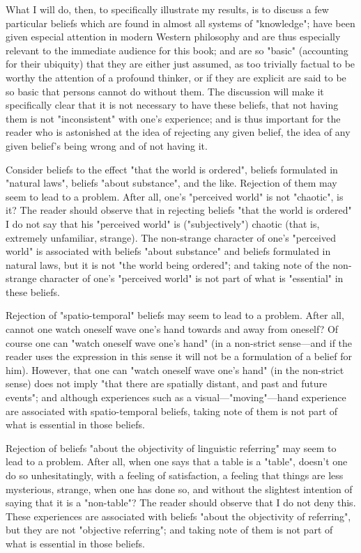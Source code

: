 \documentclass[10pt,twoside]{memoir}
\begin{document}
\begin{enumerate}
{What I will do, then, to specifically illustrate my results, is to discuss a 
few particular beliefs which are found in almost all systems of "knowledge"; 
have been given especial attention in modern Western philosophy and are 
thus especially relevant to the immediate audience for this book; and are so 
"basic" (accounting for their ubiquity) that they are either just assumed, as 
too trivially factual to be worthy the attention of a profound thinker, or if 
they are explicit are said to be so basic that persons cannot do without them. 
The discussion will make it specifically clear that it is not necessary to have 
these beliefs, that not having them is not "inconsistent" with one's 
experience; and is thus important for the reader who is astonished at the idea 
of rejecting any given belief, the idea of any given belief's being wrong and 
of not having it. 

Consider beliefs to the effect "that the world is ordered", beliefs 
formulated in "natural laws", beliefs "about substance", and the like. 
Rejection of them may seem to lead to a problem. After all, one's "perceived 
world" is not "chaotic", is it? The reader should observe that in rejecting 
beliefs "that the world is ordered" I do not say that his "perceived world" is 
("subjectively") chaotic (that is, extremely unfamiliar, strange). The 
non-strange character of one's "perceived world" is associated with beliefs 
"about substance" and beliefs formulated in natural laws, but it is not "the 
world being ordered"; and taking note of the non-strange character of one's 
"perceived world" is not part of what is "essential" in these beliefs. 

Rejection of "spatio-temporal" beliefs may seem to lead to a problem. 
After all, cannot one watch oneself wave one's hand towards and away from 
oneself? Of course one can "watch oneself wave one's hand" (in a non-strict 
sense---and if the reader uses the expression in this sense it will not be a 
formulation of a belief for him). However, that one can "watch oneself wave 
one's hand" (in the non-strict sense) does not imply "that there are spatially 
distant, and past and future events"; and although experiences such as a 
visual---"moving"---hand experience are associated with spatio-temporal 
beliefs, taking note of them is not part of what is essential in those beliefs. 

Rejection of beliefs "about the objectivity of linguistic referring" may 
seem to lead to a problem. After all, when one says that a table is a "table", 
doesn't one do so unhesitatingly, with a feeling of satisfaction, a feeling that 
things are less mysterious, strange, when one has done so, and without the 
slightest intention of saying that it is a "non-table"? The reader should 
observe that I do not deny this. These experiences are associated with beliefs 
"about the objectivity of referring", but they are not "objective referring"; 
and taking note of them is not part of what is essential in those beliefs. 

}
\end{enumerate}
\end{document}
